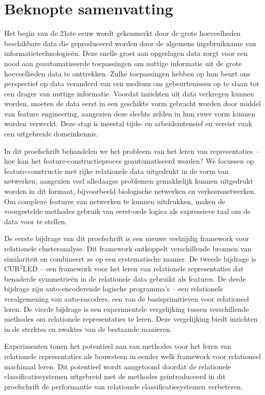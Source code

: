 \chapter{Beknopte samenvatting}

Het begin van de 21ste eeuw wordt gekenmerkt door de grote hoeveelheden beschikbare data die geproduceerd worden door de algemene ingebruikname van informatietechnologieën. Deze snelle groei aan opgeslagen data zorgt voor een nood aan geautomatiseerde toepassingen om nuttige informatie uit de grote hoeveelheden  data te onttrekken. Zulke toepassingen hebben op hun beurt ons perspectief op data veranderd van  een medium om gebeurtenissen op te slaan tot een drager van nuttige informatie. Voordat inzichten uit data verkregen kunnen worden, moeten de data eerst in een geschikte vorm gebracht worden door middel van feature engineering, aangezien deze slechts zelden in hun ruwe vorm kunnen worden verwerkt. Deze stap is meestal tijds- en arbeidsintensief en vereist vaak een uitgebreide domeinkennis.

In dit proefschrift behandelen we het probleem van het leren van representaties – hoe kan het feature-constructieproces geautomatiseerd worden? We focussen op feature-constructie met rijke relationele data uitgedrukt in de vorm van netwerken, aangezien veel alledaagse problemen gemakkelijk kunnen uitgedrukt worden in dit formaat, bijvoorbeeld biologische netwerken en verkeersnetwerken. Om complexe features van netwerken te kunnen uitdrukken, maken de voorgestelde methodes gebruik van eerst-orde logica als expressieve taal om de data voor te stellen.
 
De eerste bijdrage van dit proefschrift is een nieuwe veelzijdig framework voor relationele clusteranalyse. Dit framework ontkoppelt verschillende bronnen van similariteit en combineert ze op een systematische manier. De tweede bijdrage is CUR$^2$LED – een framework voor het leren van relationele representaties dat benaderde symmetrieën in de relationele data gebruikt als features. De derde bijdrage zijn auto-encoderende logische programma’s – een relationele veralgemening van auto-encoders, een van de basisprimitieven voor relationeel leren. De vierde bijdrage is een experimentele vergelijking tussen verschillende methodes om relationele representaties te leren. Deze vergelijking biedt inzichten in de sterktes en zwaktes van de bestaande manieren.

Experimenten tonen het potentieel aan van methodes voor het leren van relationele representaties als bouwsteen in eender welk framework voor relationeel machinaal leren. Dit potentieel wordt aangetoond doordat de relationele classificatiesystemen uitgebreid met de methodes geïntroduceerd in dit proefschrift de performantie van relationele classificatiesystemen verbeteren.


\cleardoublepage

